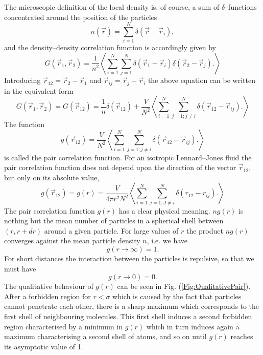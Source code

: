 The microscopic definition of the local density is, of course,
a sum of $\delta$--functions concentrated around the position of the particles
\begin{displaymath}
  n(\vec{r}) = \sum_{i=1}^N \delta(\vec{r} - \vec{r}_i),
\end{displaymath}
and the density--density correlation function is accordingly given by
\begin{displaymath}
   G(\vec{r}_1,\vec{r}_2) = \frac{1}{n^2} 
          \left\langle 
            \sum_{i=1}^N \sum_{j=1}^N \delta(\vec{r}_1 - \vec{r}_i)
                                      \delta(\vec{r}_2 - \vec{r}_j).
          \right\rangle 
\end{displaymath}
Introducing $\vec{r}_{12} = \vec{r}_2 - \vec{r}_1$ and 
$\vec{r}_{ij} = \vec{r}_j - \vec{r}_i$ the above equation can be written in
the equivalent form
\begin{displaymath}
  G(\vec{r}_1,\vec{r}_2) = G(\vec{r}_{12}) =
              \frac{1}{n} \delta(\vec{r}_{12}) +
              \frac{V}{N^2} 
               \left\langle
               \sum_{i=1}^N \sum_{j=1; j\neq i}^N 
               \delta(\vec{r}_{12} - \vec{r}_{ij}).
                \right\rangle      
\end{displaymath}
The function
\begin{displaymath}
g(\vec{r}_{12}) = \frac{V}{N^2} 
               \left\langle
               \sum_{i=1}^N \sum_{j=1; j\neq i}^N 
               \delta(\vec{r}_{12} - \vec{r}_{ij}).
                \right\rangle 
\end{displaymath}
is called the pair correlation function. For an isotropic Lennard--Jones fluid
the pair correlation function does not depend upon the direction of the vector 
$\vec{r}_{12}$, but only on its absolute value,
\begin{equation}
\label{eq:gMDdef}
g(\vec{r}_{12}) =
g(r)= \frac{V}{4 \pi r^2N^2} 
               \left\langle
               \sum_{i=1}^N \sum_{j=1; J\neq i}^N 
               \delta(r_{12} - r_{ij}).
                \right\rangle 
\end{equation}
The pair correlation function $g(r)$ has a clear physical meaning.
$n g(r)$ is nothing but the mean number of particles in a spherical shell
between $(r, r+dr)$ around a given particle. For large values of $r$ the
product $ng(r)$ converges against the mean particle density $n$, i.e. we have
\begin{displaymath}
  g(r\rightarrow \infty) = 1.
\end{displaymath}
For short distances the interaction between the particles is repulsive, so
that we must have
\begin{displaymath}
  g(r \rightarrow 0) = 0.
\end{displaymath}
The qualitative behaviour of $g(r)$ can be seen in 
Fig. (\ref{Fig:QualitativePair}). After a forbidden region for $r<\sigma$ 
which is caused by the fact that particles cannot penetrate each other, 
there is a sharp maximum which corresponds to the first shell of neighbouring
molecules. This first shell induces a second forbidden region characterised by
a minimum in $g(r)$ which in turn induces again a maximum characterising a
second shell of atoms, and so on until $g(r)$ reaches its 
asymptotic value of 1. 


